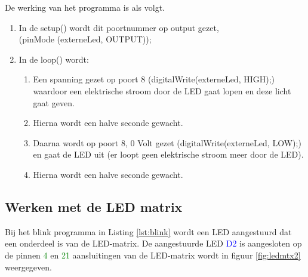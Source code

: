 De werking van het programma is als volgt.
\begin{enumerate}
	\item In de \textcolor{arduinoGreen}{setup}() wordt dit poortnummer op output gezet,\\  (\textcolor{arduinoOrange}	{pinMode} (externeLed,  \textcolor{arduinoBlue}{OUTPUT})); 
\item In de \textcolor{arduinoGreen}{loop}() wordt:
\begin{enumerate}
	\item Een spanning gezet op poort 8 (\textcolor{arduinoOrange}{digitalWrite}(externeLed, \textcolor{arduinoBlue}{HIGH});) waardoor een elektrische stroom door de LED gaat lopen en deze licht gaat geven. 
	\item Hierna wordt een halve seconde gewacht.
	\item Daarna wordt op poort 8,  0 Volt gezet (\textcolor{arduinoOrange}{digitalWrite}(externeLed, \textcolor{arduinoBlue}{LOW});) en gaat de LED uit (er loopt geen elektrische stroom meer door de LED).
		\item Hierna wordt een halve seconde gewacht.
\end{enumerate} 
\end{enumerate}
 
\subsection{Werken met de LED matrix}

Bij het blink programma in Listing \ref{lst:blink} wordt een LED aangestuurd dat een onderdeel is van de LED-matrix. De aangestuurde LED \textcolor{blue}{D2} is aangesloten op de pinnen \textcolor{green}{4} en \textcolor{green}{21}  aansluitingen van de LED-matrix wordt in figuur \ref{fig:ledmtx2} weergegeven.


